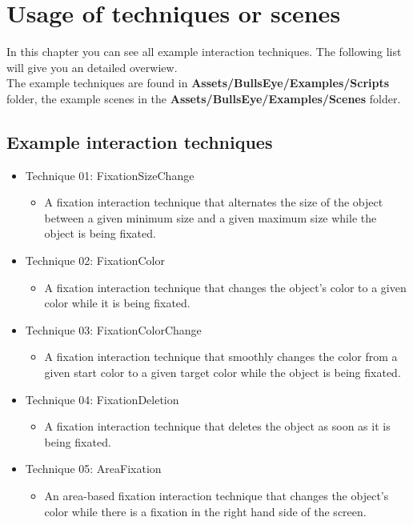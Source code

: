 \documentclass[../../Instructions_Framework]{subfiles}
\begin{document}
\chapter{Usage of techniques or scenes}
\label{usage}
In this chapter you can see all example interaction techniques. The following list will give you an detailed overwiew.\\
The example techniques are found in \textbf{Assets/BullsEye/Examples/Scripts} folder, the example scenes in the \textbf{Assets/BullsEye/Examples/Scenes} folder.
\section{Example interaction techniques}
\begin{itemize}
	\item Technique 01: FixationSizeChange
	\begin{itemize}
		\item A fixation interaction technique that alternates the size of the object between a given minimum size and a given maximum size while the object is being fixated.
	\end{itemize}
	\item Technique 02: FixationColor
	\begin{itemize}
		\item A fixation interaction technique that changes the object's color to a given color while it is being fixated.
	\end{itemize}
	\item Technique 03: FixationColorChange
	\begin{itemize}
		\item A fixation interaction technique that smoothly changes the color from a given start color to a given target color while the object is being fixated.
	\end{itemize}
		\item Technique 04: FixationDeletion
	\begin{itemize}
		\item A fixation interaction technique that deletes the object as soon as it is being fixated.
	\end{itemize}
		\item Technique 05: AreaFixation
	\begin{itemize}
		\item An area-based fixation interaction technique that changes the object's color while there is a fixation in the right hand side of the screen.
	\end{itemize}

\end{itemize}
\end{document}
